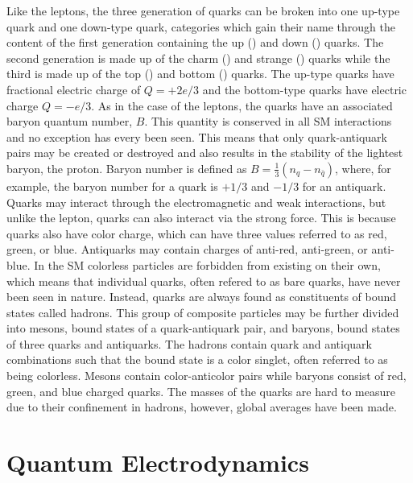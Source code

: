 Like the leptons, the three generation of quarks can be broken into one up-type quark and one down-type quark, categories which gain their name through the content of the first generation containing the up (\cPqu) and down (\cPqd) quarks.
The second generation is made up of the charm (\cPqc) and strange (\cPqs) quarks while the third is made up of the top (\cPqt) and bottom (\cPqb) quarks.
The up-type quarks have fractional electric charge of $Q=+2e/3$ and the bottom-type quarks have electric charge $Q=-e/3$.
As in the case of the leptons, the quarks have an associated baryon quantum number, $B$.
This quantity is conserved in all SM interactions and no exception has every been seen.
This means that only quark-antiquark pairs may be created or destroyed and also results in the stability of the lightest baryon, the proton.
Baryon number is defined as $B=\frac{1}{3}\left(n_{q}-n_{\bar{q}}\right)$, where, for example, the baryon number for a quark is $+1/3$ and $-1/3$ for an antiquark.
Quarks may interact through the electromagnetic and weak interactions, but unlike the lepton, quarks can also interact via the strong force.
This is because quarks also have color charge, which can have three values referred to as red, green, or blue. 
Antiquarks may contain charges of anti-red, anti-green, or anti-blue.
In the SM colorless particles are forbidden from existing on their own, which means that individual quarks, often refered to as bare quarks, have never been seen in nature.
Instead, quarks are always found as constituents of bound states called hadrons.
This group of composite particles may be further divided into mesons, bound states of a quark-antiquark pair, and baryons, bound states of three quarks and antiquarks.
The hadrons contain quark and antiquark combinations such that the bound state is a color singlet, often referred to as being colorless.
Mesons contain color-anticolor pairs while baryons consist of red, green, and blue charged quarks.
The masses of the quarks are hard to measure due to their confinement in hadrons, however, global averages have been made.

\section{Quantum Electrodynamics}
\label{sec:QED}

